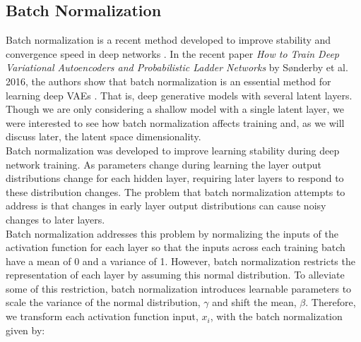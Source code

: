 \documentclass{article} %
\begin{document}
%


\subsection{Batch Normalization}
%


Batch normalization is a recent method developed to improve stability and convergence speed in deep networks \cite{Ioffe2015}. In the recent paper \textit{How to Train Deep Variational Autoencoders and Probabilistic Ladder Networks} by S\o nderby et al. 2016, the authors show that batch normalization is an essential method for learning deep VAEs \cite{Sonderby2016}. That is, deep generative models with several latent layers. Though we are only considering a shallow model with a single latent layer, we were interested to see how batch normalization affects training and, as we will discuss later, the latent space dimensionality.\\
Batch normalization was developed to improve learning stability during deep network training. As parameters change during learning the layer output distributions change for each hidden layer, requiring later layers to respond to these distribution changes. The problem that batch normalization attempts to address is that changes in early layer output distributions can cause noisy changes to later layers.\\
Batch normalization addresses this problem by normalizing the inputs of the activation function for each layer so that the inputs across each training batch have a mean of 0 and a variance of 1. However, batch normalization restricts the representation of each layer by assuming this normal distribution. To alleviate some of this restriction, batch normalization introduces learnable parameters to scale the variance of the normal distribution, $\gamma$ and shift the mean, $\beta$. Therefore, we transform each activation function input, $x_i$, with the batch normalization given by:
\end{document}
